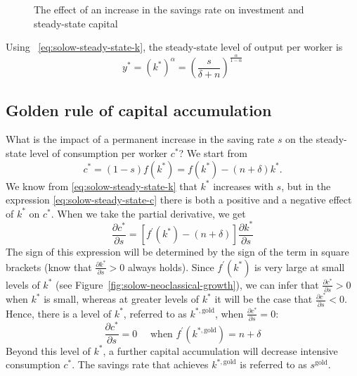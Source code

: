 \documentclass[\topdir/lecture\_notes.tex]{subfiles}
\begin{document}
\begin{figure}[h]
\begin{center}
  \caption{The effect of an increase in the savings rate on investment and steady-state capital}
  \label{fig:solow-investment-shift}
\end{center}
\end{figure}

Using ~\ref{eq:solow-steady-state-k}, the steady-state level of output per worker is
\begin{equation}
y^{*}=\left(k^{*}\right)^{\alpha}=\left(\frac{s}{\delta+n}\right)^{\frac{\alpha}{1-\alpha}}
\label{eq:solow-steady-state-y}
\end{equation}

\subsection{Golden rule of capital accumulation}
What is the impact of a permanent increase in the saving rate \(s\) on the steady-state level of consumption per worker \(c^{*}\)? We start from
\begin{equation}
  c^{*}=(1-s) f\left(k^{*}\right)=f\left(k^{*}\right)-(n+\delta) k^{*}. \label{eq:solow-steady-state-c}
\end{equation}
We know from \eqref{eq:solow-steady-state-k} that \(k^{*}\) increases with \(s\), but in the expression \eqref{eq:solow-steady-state-c} there is both a positive and a negative effect of \(k^{*}\) on \(c^{*}\).
When we take the partial derivative, we get
\begin{equation}
  \frac{\partial c^{*}}{\partial s}=\left[f^{\prime}\left(k^{*}\right)-(n+\delta)\right] \frac{\partial k^{*}}{\partial s} \label{eq:solow-c-derivative}
\end{equation}
The sign of this expression will be determined by the sign of the term in square brackets (know that \(\frac{\partial k^{*}}{\partial s}>0\) always holds).
Since \(f^{\prime}\left(k^{*}\right)\) is very large at small levels of \(k^{*}\) (see Figure~\ref{fig:solow-neoclassical-growth}), we can infer that \(\frac{\partial c^{*}}{\partial s}>0\) when \(k^{*}\) is small, whereas at greater levels of \(k^{*}\) it will be the case that \(\frac{\partial c^{*}}{\partial s}<0\).
Hence, there is a level of \(k^{*}\), referred to as \(k^{*, \text{gold}}\), when \(\frac{\partial c^{*}}{\partial s}=0\):
\begin{equation}
  \frac{\partial c^{*}}{\partial s}=0 \quad \text { when } f^{\prime}\left(k^{*, \text{gold}}\right)=n+\delta
  \label{eq:solow-golden-rule}
\end{equation}
Beyond this level of \(k^{*}\), a further capital accumulation will decrease intensive consumption \(c^{*}\).
The savings rate that achieves \(k^{*, \text{gold}}\) is referred to as \(s^{\text{gold}}\).
\end{document}
